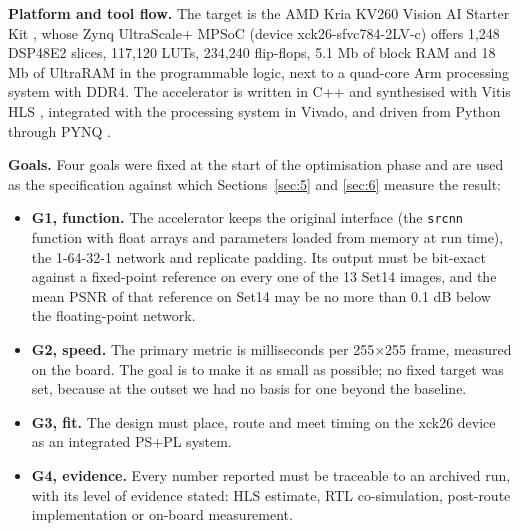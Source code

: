 \textbf{Platform and tool flow.} The target is the AMD Kria KV260 Vision AI Starter Kit \cite{ref11}, whose Zynq UltraScale+ MPSoC (device xck26-sfvc784-2LV-c) offers 1,248 DSP48E2 slices, 117,120 LUTs, 234,240 flip-flops, 5.1 Mb of block RAM and 18 Mb of UltraRAM in the programmable logic, next to a quad-core Arm processing system with DDR4. The accelerator is written in C++ and synthesised with Vitis HLS \cite{ref12}, integrated with the processing system in Vivado, and driven from Python through PYNQ \cite{ref13}.

\textbf{Goals.} Four goals were fixed at the start of the optimisation phase and are used as the specification against which Sections~\ref{sec:5} and \ref{sec:6} measure the result:

\begin{itemize}
\item \textbf{G1, function.} The accelerator keeps the original interface (the \texttt{srcnn} function with float arrays and parameters loaded from memory at run time), the 1-64-32-1 network and replicate padding. Its output must be bit-exact against a fixed-point reference on every one of the 13 Set14 images, and the mean PSNR of that reference on Set14 may be no more than 0.1 dB below the floating-point network.
\item \textbf{G2, speed.} The primary metric is milliseconds per 255$\times$255 frame, measured on the board. The goal is to make it as small as possible; no fixed target was set, because at the outset we had no basis for one beyond the baseline.
\item \textbf{G3, fit.} The design must place, route and meet timing on the xck26 device as an integrated PS+PL system.
\item \textbf{G4, evidence.} Every number reported must be traceable to an archived run, with its level of evidence stated: HLS estimate, RTL co-simulation, post-route implementation or on-board measurement.
\end{itemize}

